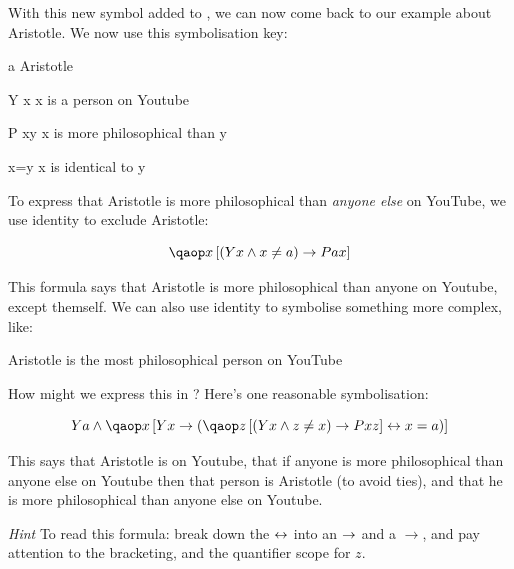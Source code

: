 \documentclass[PHIL101-Textbook.tex]{subfiles}
\begin{document}
With this new symbol added to \pl, we can now come back to our example about Aristotle.
We now use this symbolisation key:

\begin{ekey}
\item[a] Aristotle
\item[\atom Y x] x is a person on Youtube
\item[\atom P xy ] x is more philosophical than y
\item[x=y] x is identical to y
\end{ekey}

\noindent To express that Aristotle is more philosophical than \emph{anyone else} on YouTube, we use identity to exclude Aristotle:

$$ \qab{x}{(\atom Yx \eand x \neq a) \eif \atom P ax}$$

\noindent This formula says that Aristotle is more philosophical than anyone on Youtube, except themself.
We can also use identity to symbolise something more complex, like:

\begin{earg}
\item[\ex{most}] Aristotle is the most philosophical person on YouTube
\end{earg}

\noindent How might we express this in \pl? Here's one reasonable symbolisation:





$$\atom Y a \land \qab{x}{\atom Y x \eif (\qab{z}{(\atom Y x \eand z \neq x) \eif \atom P xz } \eiff x = a)}$$ 

\noindent This says that Aristotle is on Youtube, that if anyone is more philosophical than anyone else on Youtube then that person is Aristotle (to avoid ties), and that he is more philosophical than anyone else on Youtube.

\noindent \textit{Hint} To read this formula: break down the $\leftrightarrow$ into an $\rightarrow$ and a $\rightarrow$, and pay attention to the bracketing, and the quantifier scope for $z$.
\end{document}
